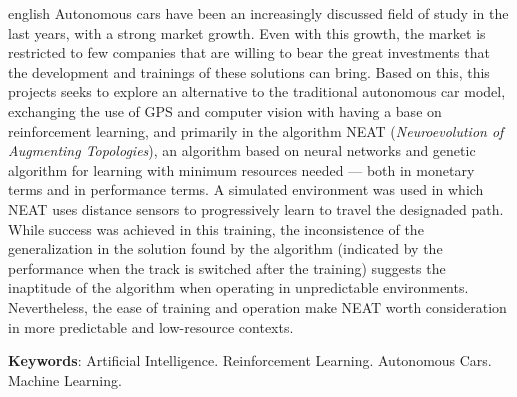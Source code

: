 \begin{resumo}[Abstract]
	\begin{otherlanguage*}{english}
		Autonomous cars have been an increasingly discussed field of study in
		the last years, with a strong market growth. Even with this
		growth, the market is restricted to few companies that are willing to
		bear the great investments that the development and trainings of these
		solutions can bring. Based on this, this projects seeks to explore an
		alternative to the traditional autonomous car model, exchanging the use
		of GPS and computer vision with having a base on reinforcement
		learning, and primarily in the algorithm NEAT (\textit{Neuroevolution
		of Augmenting Topologies}), an algorithm based on neural networks and
		genetic algorithm for learning with minimum resources needed — both in
		monetary terms and in performance terms. A simulated environment was
		used in which NEAT uses distance sensors to progressively learn to
		travel the designaded path. While success was achieved in this
		training, the inconsistence of the generalization in the solution found
		by the algorithm (indicated by the performance when the track is
		switched after the training) suggests the inaptitude of the algorithm
		when operating in unpredictable environments. Nevertheless, the ease of
		training and operation make NEAT worth consideration in more
		predictable and low-resource contexts.

        \vspace{\onelineskip}

        \noindent 
        \textbf{Keywords}: Artificial Intelligence. Reinforcement Learning. Autonomous Cars. Machine Learning.
    \end{otherlanguage*}
\end{resumo}

